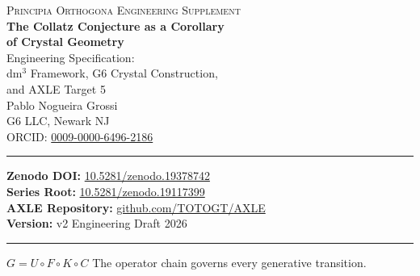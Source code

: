 \documentclass[11pt, a4paper]{article}
\theoremstyle{definition}
\newcommand{\gmon}{g_6}
\begin{document}
\begin{titlepage}
\centering
\vspace*{2cm}

{\small\scshape Principia Orthogona   Engineering Supplement}\\[0.5cm]

{\LARGE\bfseries The Collatz Conjecture as a Corollary\\[4pt]
of Crystal Geometry}\\[0.8cm]

{\large Engineering Specification:\\
dm$^3$ Framework, G6 Crystal Construction,\\
and AXLE Target 5}\\[1.5cm]

{\large Pablo Nogueira Grossi}\\[0.3cm]
{\normalsize G6 LLC, Newark NJ}\\
{\normalsize ORCID: \href{https://orcid.org/0009-0000-6496-2186}{0009-0000-6496-2186}}\\[0.8cm]

\hrule\vspace{0.4cm}
{\small
\textbf{Zenodo DOI:} \href{https://doi.org/10.5281/zenodo.19378742}{10.5281/zenodo.19378742}\\[2pt]
\textbf{Series Root:} \href{https://doi.org/10.5281/zenodo.19117399}{10.5281/zenodo.19117399}\\[2pt]
\textbf{AXLE Repository:} \href{https://github.com/TOTOGT/AXLE}{github.com/TOTOGT/AXLE}\\[2pt]
\textbf{Version:} v2   Engineering Draft   2026
}\vspace{0.4cm}
\hrule

\vfill
{\small $G = U \circ F \circ K \circ C$ \quad The operator chain governs every generative transition.}
\end{titlepage}

\begin{abstract}
This document is the engineering specification accompanying the Collatz--Crystal paper.
It provides explicit dm$^3$ axioms in computable form, Python implementations of the operator
chain $G = U \circ F \circ K \circ C$, construction of the G6 Crystal lattice, Julia numerical
integration of dm$^3$ flows, Lean~4 stubs for AXLE Target~5, and TikZ figures for each key
structure. The goal is to give an engineer or applied mathematician every tool needed to
\textbf{build, simulate, and formally verify} a dm$^3$ system, identify the monster threshold
$\gmon = 33$, and understand precisely where the gap between the continuous framework and
discrete Collatz arithmetic lies.
\textbf{The polar vortex is the empirical certificate. This document is the build manual.}

\medskip
\noindent\textbf{MSC (2020):} 37C10, 37B25, 11B37, 70K45, 76E20.\\
\textbf{Keywords:} dm$^3$ system, Collatz conjecture, G6 Crystal, monster threshold, AXLE,
limit cycle, Lyapunov stability, Saturn hexagon, formal verification, Lean 4.
\end{abstract}
\end{document}

